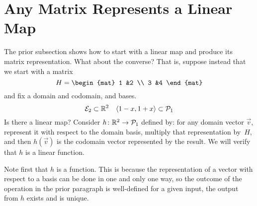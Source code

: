 \documentclass[10pt,t]{beamer}
\begin{document}
\section{Any Matrix Represents a Linear Map}
\begin{frame}
\ex
The prior subsection shows how to start with a linear map and produce its matrix
representation.
What about the converse?
That is, 
suppose instead that we start with a matrix
\begin{equation*}
  H=\begin{mat}
    1 &2 \\
    3 &4
  \end{mat}
\end{equation*}
and fix a domain and codomain, and bases.
\begin{equation*}
  {\cal E}_2\subset\mathbb{R}^2
  \quad
  \langle1-x,1+x\rangle\subset\mathcal{P}_1
\end{equation*}
Is there a linear map?
\pause
Consider $\mbox{$h\colon \mathbb{R}^2\to \mathcal{P}_1$}$ defined by:
for any domain vector $\vec{v}$, represent it with respect to the domain basis,
multiply that representation by~$H$, 
and then $h(\vec{v})$ is the codomain vector represented by
the result.
We will verify that $h$ is a linear function.

\pause
Note first that $h$ is a function.
This is because
the representation of a vector with respect to a basis can be done in
one and only one way, so the outcome of the operation in the prior paragraph
is well-defined\Dash 
for a given input, the output from $h$ exists and is unique. 
\end{frame}
\end{document}
